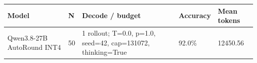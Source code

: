 \begin{tabular}{lllll}
\hline
Model & N & Decode / budget & Accuracy & Mean tokens \\
\hline
Qwen3.8-27B AutoRound INT4 & 50 & 1 rollout; T=0.0, p=1.0, seed=42, cap=131072, thinking=True & 92.0\% & 12450.56 \\
\hline
\end{tabular}
